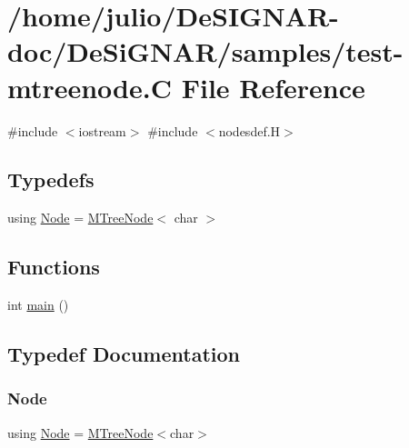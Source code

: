 \hypertarget{test-mtreenode_8_c}{}\section{/home/julio/\+De\+S\+I\+G\+N\+A\+R-\/doc/\+De\+Si\+G\+N\+A\+R/samples/test-\/mtreenode.C File Reference}
\label{test-mtreenode_8_c}
{\ttfamily \#include $<$iostream$>$}\newline
{\ttfamily \#include $<$nodesdef.\+H$>$}\newline
\subsection*{Typedefs}
\begin{DoxyCompactItemize}
\item 
using \hyperlink{test-mtreenode_8_c_a17a24b0725f59987143c5faf63c4dc6f}{Node} = \hyperlink{class_designar_1_1_m_tree_node}{M\+Tree\+Node}$<$ char $>$
\end{DoxyCompactItemize}
\subsection*{Functions}
\begin{DoxyCompactItemize}
\item 
int \hyperlink{test-mtreenode_8_c_ae66f6b31b5ad750f1fe042a706a4e3d4}{main} ()
\end{DoxyCompactItemize}


\subsection{Typedef Documentation}
\mbox{\label{test-mtreenode_8_c_a17a24b0725f59987143c5faf63c4dc6f}} 
\subsubsection{\texorpdfstring{Node}{Node}}
{\footnotesize\ttfamily using \hyperlink{namespace_designar_a5af326c65aa2bd26b26c410f2030d09e}{Node} =  \hyperlink{class_designar_1_1_m_tree_node}{M\+Tree\+Node}$<$char$>$}



